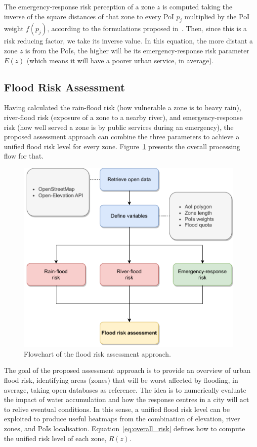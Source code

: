 \begin{refsection}
The emergency-response risk perception of a zone $z$ is computed taking the inverse of the square distances of that zone to every PoI $p_j$ multiplied by the PoI weight $f(p_j)$, according to the formulations proposed in~\cite{sensorsposition,cityzones}. Then, since this is a risk reducing factor, we take its inverse value. In this equation, the more distant a zone $z$ is from the PoIs, the higher will be its emergency-response risk parameter $E(z)$ (which means it will have a poorer urban service, in average).

\subsection{Flood Risk Assessment}

Having calculated the rain-flood risk (how vulnerable a zone is to heavy rain), river-flood risk (exposure of a zone to a nearby river), and emergency-response risk (how well served a zone is by public services during an emergency), the proposed assessment approach can combine the three parameters to achieve a unified flood risk level for every zone. Figure~\ref{fig:assessment_flow} presents the overall processing flow for that. 

\begin{figure}[ht]
  \centering
  \includegraphics[width=0.9\linewidth]{Chapters/6-Flood/figs/assessment_flow.pdf}
  \caption{Flowchart of the flood risk assessment approach.}\label{fig:assessment_flow}
\end{figure}

The goal of the proposed assessment approach is to provide an overview of urban flood risk, identifying areas (zones) that will be worst affected by flooding, in average, taking open databases as reference. The idea is to numerically evaluate the impact of water accumulation and how the response centres in a city will act to relive eventual conditions. In this sense, a unified flood risk level can be exploited to produce useful heatmaps from the combination of elevation, river zones, and PoIs localisation. Equation~\ref{eq:overall_risk} defines how to compute the unified risk level of each zone, $R(z)$.


\end{refsection}
